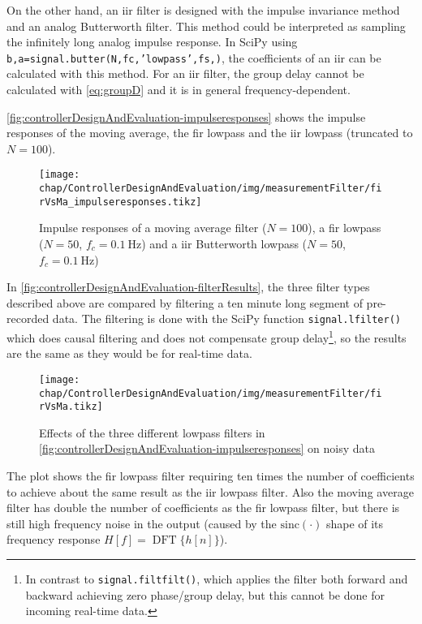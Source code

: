 On the other hand, an \gls{iir} filter is designed with the impulse invariance method and an analog Butterworth filter.
This method could be interpreted as sampling the infinitely long analog impulse response. \cite[p.~497]{Oppenheim2010}
In SciPy using \texttt{b,a=signal.butter(N,fc,'lowpass',fs,)}, the coefficients of an \gls{iir} can be calculated with this method.
For an \gls{iir} filter, the group delay cannot be calculated with \autoref{eq:groupD} and it is in general frequency-dependent.

\autoref{fig:controllerDesignAndEvaluation-impulseresponses} shows the impulse responses of the moving average, the \gls{fir} lowpass and the \gls{iir} lowpass (truncated to $N=100$).

\begin{figure}[tb]
	\centering
	\texttt{[image: chap/ControllerDesignAndEvaluation/img/measurementFilter/firVsMa\_impulseresponses.tikz]}
	\caption[Impulse Responses of different time discrete filters]{Impulse responses of a moving average filter ($N=100$), a \gls{fir} lowpass ($N=50$, $f_c=\SI{0.1}{\hertz}$) and a \gls{iir} Butterworth lowpass ($N=50$, $f_c=\SI{0.1}{\hertz}$)}
	\label{fig:controllerDesignAndEvaluation-impulseresponses}
\end{figure}

In \autoref{fig:controllerDesignAndEvaluation-filterResults}, the three filter types described above are compared by filtering a ten minute long segment of pre-recorded data. The filtering is done with the SciPy function \texttt{signal.lfilter()} which does causal filtering and does not compensate group delay\footnote{In contrast to \texttt{signal.filtfilt()}, which applies the filter both forward and backward achieving zero phase/group delay, but this cannot be done for incoming real-time data.}, so the results are the same as they would be for real-time data.

\begin{figure}[tb]
	\centering
	\texttt{[image: chap/ControllerDesignAndEvaluation/img/measurementFilter/firVsMa.tikz]}
	\caption[Filter effects of different time discrete filters]{Effects of the three different lowpass filters in \autoref{fig:controllerDesignAndEvaluation-impulseresponses} on noisy data}
	\label{fig:controllerDesignAndEvaluation-filterResults}
\end{figure}

The plot shows the \gls{fir} lowpass filter requiring ten times the number of coefficients to achieve about the same result as the \gls{iir} lowpass filter.
Also the moving average filter has double the number of coefficients as the \gls{fir} lowpass filter, but there is still high frequency noise in the output (caused by the $\text{sinc}(\cdot)$ shape of its frequency response $H[f]=\operatorname{DFT}\{h[n]\}$).

